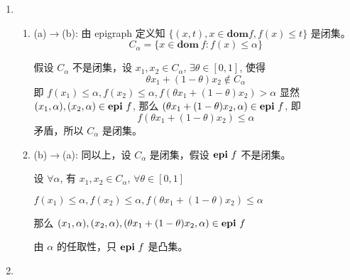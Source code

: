 \documentclass[11pt,letter,notitlepage]{article}
\theoremstyle{definition}
\newcommand{\dom}{ \textbf{dom}  }
\DeclareMathOperator*{\epi}{\bf epi\,}
\begin{document}
\begin{solution}
	\begin{enumerate}
		\item \begin{enumerate}
			      \item (a)$\to$(b): 由 epigraph 定义知 $\{(x,t),x\in \dom f, f(x)\leq t\}$ 是闭集。
			            $$C_\alpha=\{x\in \dom\ f: f(x)\leq \alpha\}$$

			            假设 $C_\alpha$ 不是闭集，设 $x_1,x_2\in C_\alpha$, $\exists \theta \in [0,1]$, 使得 $$\theta x_1+(1-\theta) x_2 \notin C_\alpha$$
			            即 $f(x_1)\leq \alpha, f(x_2)\leq \alpha, f(\theta x_1+(1-\theta) x_2)>\alpha$
			            显然 $(x_1,\alpha),(x_2,\alpha) \in \epi f$, 那么 $(\theta x_1+(1-\theta) x_2,\alpha)\in \epi f$, 即
			            $$f(\theta x_1+(1-\theta) x_2)\leq \alpha$$
			            矛盾，所以 $C_\alpha$ 是闭集。
			      \item (b)$\to$(a): 同以上，设 $C_\alpha$ 是闭集，假设 $\epi f$ 不是闭集。

			            设 $\forall \alpha$, 有 $x_1,x_2\in C_\alpha$, $\forall \theta \in [0,1]$

			            $f(x_1)\leq \alpha, f(x_2)\leq \alpha, f(\theta x_1+(1-\theta) x_2)\leq\alpha$

			            那么 $(x_1,\alpha),(x_2,\alpha),(\theta x_1+(1-\theta) x_2,\alpha) \in \epi f$

			            由 $\alpha$ 的任取性，只 $\epi f$ 是凸集。
		      \end{enumerate}
		\item
	\end{enumerate}
\end{solution}
\newpage
\end{document}
